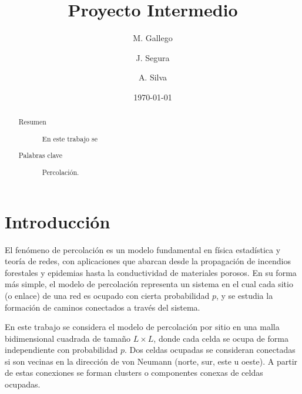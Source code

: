 \documentclass[%
 reprint,
 amsmath,amssymb,
 aps,
]{revtex4-2}
\begin{document}

\title{Proyecto Intermedio}%

 
\author{M. Gallego}
\author{J. Segura}
\author{A. Silva}
%
\date{\today}%
\begin{abstract}
\begin{description}
\item[Resumen] En este trabajo se 


\end{description}
\begin{description}
\item[Palabras clave] Percolación.

\end{description}
\end{abstract}

\maketitle

\section{Introducción}

El fenómeno de percolación es un modelo fundamental en física estadística y teoría de redes, con aplicaciones que abarcan desde la propagación de incendios forestales y epidemias hasta la conductividad de materiales porosos. En su forma más simple, el modelo de percolación representa un sistema en el cual cada sitio (o enlace) de una red es ocupado con cierta probabilidad $p$, y se estudia la formación de caminos conectados a través del sistema.

En este trabajo se considera el modelo de percolación por sitio en una malla bidimensional cuadrada de tamaño $L \times L$, donde cada celda se ocupa de forma independiente con probabilidad $p$. Dos celdas ocupadas se consideran conectadas si son vecinas en la dirección de von Neumann (norte, sur, este u oeste). A partir de estas conexiones se forman clusters o componentes conexas de celdas ocupadas.
\end{document}
